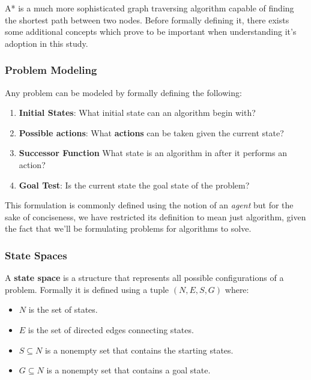 
A* is a much more sophisticated graph traversing algorithm capable of finding the shortest path between two nodes. Before formally defining it, there exists some additional concepts which prove to be important when understanding it's adoption in this study.

\subsubsection{Problem Modeling}

Any problem can be modeled by formally defining the following:
\begin{enumerate}
    \item \textbf{Initial States}: What initial state can an algorithm begin with?
    \item \textbf{Possible actions}: What \textbf{actions} can be taken given the current state?
    \item \textbf{Successor Function} What state is an algorithm in after it performs an action?
    \item \textbf{Goal Test}: Is the current state the goal state of the problem?
\end{enumerate}

\noindent This formulation is commonly defined using the notion of an \textit{agent} but for the sake of conciseness, we have restricted its definition to mean just algorithm, given the fact that we'll be formulating problems for algorithms to solve.



\subsubsection{State Spaces}
A \textbf{state space} is a structure that represents all possible configurations of a problem. Formally it is defined using a tuple $(N,E,S,G)$ where:

\begin{itemize}
    \item $N$ is the set of states.
    \item $E$ is the set of directed edges connecting states.
    \item $S \subseteq N$ is a nonempty set that contains the starting states.
    \item $G \subseteq N$ is a nonempty set that contains a goal state.
\end{itemize}

